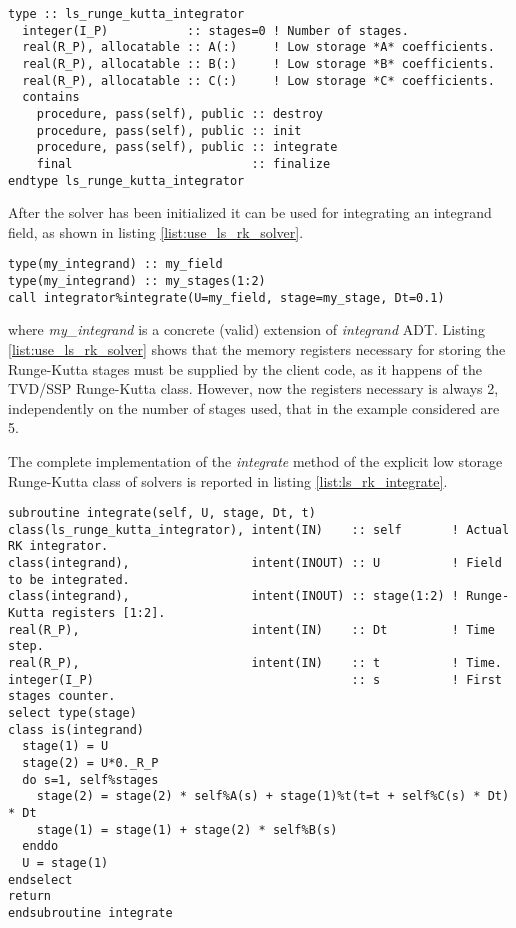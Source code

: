 \documentclass[pdftex,preprint,3p,times,numbers]{elsarticle}
\begin{document}
\begin{lstlisting}[firstnumber=1,style=code,caption={definition of \emph{ls\_runge\_kutta\_integrator} type},label={list:ls_rk_solver}]
type :: ls_runge_kutta_integrator
  integer(I_P)           :: stages=0 ! Number of stages.
  real(R_P), allocatable :: A(:)     ! Low storage *A* coefficients.
  real(R_P), allocatable :: B(:)     ! Low storage *B* coefficients.
  real(R_P), allocatable :: C(:)     ! Low storage *C* coefficients.
  contains
    procedure, pass(self), public :: destroy
    procedure, pass(self), public :: init
    procedure, pass(self), public :: integrate
    final                         :: finalize
endtype ls_runge_kutta_integrator
\end{lstlisting}

After the solver has been initialized it can be used for integrating an integrand field, as shown in listing \ref{list:use_ls_rk_solver}.

\begin{lstlisting}[firstnumber=1,style=code,caption={example of usage of a low storage Runge-Kutta integrator},label={list:use_ls_rk_solver}]
type(my_integrand) :: my_field
type(my_integrand) :: my_stages(1:2)
call integrator%integrate(U=my_field, stage=my_stage, Dt=0.1)
\end{lstlisting}
where \emph{my\_integrand} is a concrete (valid) extension of \emph{integrand} ADT. Listing \ref{list:use_ls_rk_solver} shows that the memory registers necessary for storing the Runge-Kutta stages must be supplied by the client code, as it happens of the TVD/SSP Runge-Kutta class. However, now the registers necessary is always 2, independently on the number of stages used, that in the example considered are 5.

The complete implementation of the \emph{integrate} method of the explicit low storage Runge-Kutta class of solvers is reported in listing \ref{list:ls_rk_integrate}.

\begin{lstlisting}[firstnumber=1,style=code,caption={implementation of the \emph{integrate} method of explicit low storage Runge-Kutta class},label={list:ls_rk_integrate}]
subroutine integrate(self, U, stage, Dt, t)
class(ls_runge_kutta_integrator), intent(IN)    :: self       ! Actual RK integrator.
class(integrand),                 intent(INOUT) :: U          ! Field to be integrated.
class(integrand),                 intent(INOUT) :: stage(1:2) ! Runge-Kutta registers [1:2].
real(R_P),                        intent(IN)    :: Dt         ! Time step.
real(R_P),                        intent(IN)    :: t          ! Time.
integer(I_P)                                    :: s          ! First stages counter.
select type(stage)
class is(integrand)
  stage(1) = U
  stage(2) = U*0._R_P
  do s=1, self%stages
    stage(2) = stage(2) * self%A(s) + stage(1)%t(t=t + self%C(s) * Dt) * Dt
    stage(1) = stage(1) + stage(2) * self%B(s)
  enddo
  U = stage(1)
endselect
return
endsubroutine integrate
\end{lstlisting}
\end{document}

